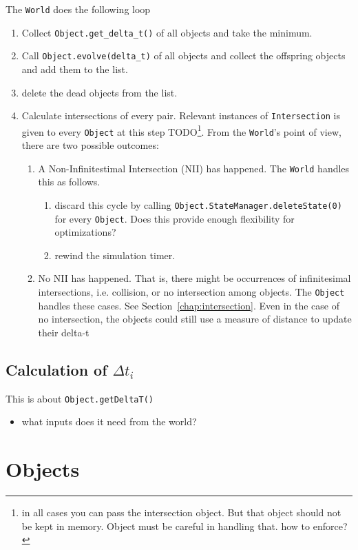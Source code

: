 \documentclass[a4paper]{report}
\newcommand{\cm}[1]{{\color{red}#1}}
\newcommand{\ai}[1]{{\color{blue}#1}}
\begin{document}
The \verb+World+ does the following loop
\begin{enumerate}
	\item Collect \verb+Object.get_delta_t()+ of all objects and take the minimum.
	\item Call \verb+Object.evolve(delta_t)+ of all objects and collect the offspring objects and add them to the list.
	\item delete the dead objects from the list.
	\item Calculate intersections of every pair. Relevant instances of \verb+Intersection+ is given to every \verb+Object+ at this step TODO\footnote{\ai{in all cases you can pass the intersection object. But that object should not be kept in memory. Object must be careful in handling that. how to enforce?}}. From the \verb+World+'s point of view, there are two possible outcomes:
	\begin{enumerate}
		\item A Non-Infinitestimal Intersection (NII) has happened. The \verb+World+ handles this as follows. 
		\begin{enumerate}
			\item discard this cycle by calling \verb+Object.StateManager.deleteState(0)+ for every \verb+Object+. \cm{Does this provide enough flexibility for optimizations?}
			\item rewind the simulation timer.
		\end{enumerate}
		\item No NII has happened. That is, there might be occurrences of infinitesimal intersections, i.e. collision, or no intersection among objects. The \verb+Object+ handles these cases. See Section~\ref{chap:intersection}. \cm{Even in the case of no intersection, the objects could still use a measure of distance to update their delta-t}
	\end{enumerate}
\end{enumerate}

\section{Calculation of $\Delta t_i$}
This is about \verb+Object.getDeltaT()+

\begin{itemize}
\item what inputs does it need from the world?
\end{itemize}

\chapter{Objects}
\end{document}
